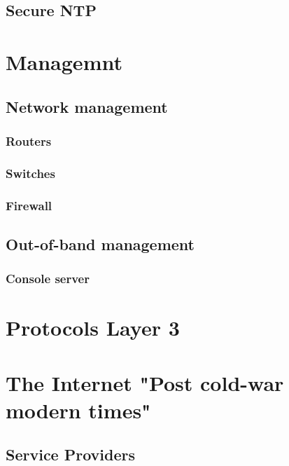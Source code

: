 \documentclass[a4paper,12pt,twoside,twocolumn,landscape]{book}
\begin{document}
\section{Secure NTP}


\chapter{Managemnt}

\section{Network management}

\subsection{Routers}

\subsection{Switches}

\subsection{Firewall}

\section{Out-of-band management}

\subsection{Console server}


\chapter{Protocols Layer 3}




\chapter{The Internet {\footnotesize "Post cold-war modern times"}}

\section{Service Providers}
\end{document}
